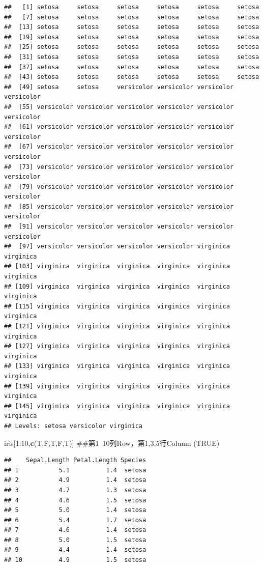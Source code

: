 \documentclass[]{book}
\newenvironment{Shaded}{\begin{snugshade}}{\end{snugshade}}
\newcommand{\KeywordTok}[1]{\textcolor[rgb]{0.13,0.29,0.53}{\textbf{{#1}}}}
\newcommand{\DecValTok}[1]{\textcolor[rgb]{0.00,0.00,0.81}{{#1}}}
\newcommand{\NormalTok}[1]{{#1}}
\theoremstyle{definition}
\theoremstyle{definition}
\theoremstyle{remark}
\begin{document}
\begin{verbatim}
##   [1] setosa     setosa     setosa     setosa     setosa     setosa    
##   [7] setosa     setosa     setosa     setosa     setosa     setosa    
##  [13] setosa     setosa     setosa     setosa     setosa     setosa    
##  [19] setosa     setosa     setosa     setosa     setosa     setosa    
##  [25] setosa     setosa     setosa     setosa     setosa     setosa    
##  [31] setosa     setosa     setosa     setosa     setosa     setosa    
##  [37] setosa     setosa     setosa     setosa     setosa     setosa    
##  [43] setosa     setosa     setosa     setosa     setosa     setosa    
##  [49] setosa     setosa     versicolor versicolor versicolor versicolor
##  [55] versicolor versicolor versicolor versicolor versicolor versicolor
##  [61] versicolor versicolor versicolor versicolor versicolor versicolor
##  [67] versicolor versicolor versicolor versicolor versicolor versicolor
##  [73] versicolor versicolor versicolor versicolor versicolor versicolor
##  [79] versicolor versicolor versicolor versicolor versicolor versicolor
##  [85] versicolor versicolor versicolor versicolor versicolor versicolor
##  [91] versicolor versicolor versicolor versicolor versicolor versicolor
##  [97] versicolor versicolor versicolor versicolor virginica  virginica 
## [103] virginica  virginica  virginica  virginica  virginica  virginica 
## [109] virginica  virginica  virginica  virginica  virginica  virginica 
## [115] virginica  virginica  virginica  virginica  virginica  virginica 
## [121] virginica  virginica  virginica  virginica  virginica  virginica 
## [127] virginica  virginica  virginica  virginica  virginica  virginica 
## [133] virginica  virginica  virginica  virginica  virginica  virginica 
## [139] virginica  virginica  virginica  virginica  virginica  virginica 
## [145] virginica  virginica  virginica  virginica  virginica  virginica 
## Levels: setosa versicolor virginica
\end{verbatim}

\begin{Shaded}
\begin{Highlighting}[]
\NormalTok{iris[}\DecValTok{1}\NormalTok{:}\DecValTok{10}\NormalTok{,}\KeywordTok{c}\NormalTok{(T,F,T,F,T)] ##第1~10列Row，第1,3,5行Column (TRUE)}
\end{Highlighting}
\end{Shaded}

\begin{verbatim}
##    Sepal.Length Petal.Length Species
## 1           5.1          1.4  setosa
## 2           4.9          1.4  setosa
## 3           4.7          1.3  setosa
## 4           4.6          1.5  setosa
## 5           5.0          1.4  setosa
## 6           5.4          1.7  setosa
## 7           4.6          1.4  setosa
## 8           5.0          1.5  setosa
## 9           4.4          1.4  setosa
## 10          4.9          1.5  setosa
\end{verbatim}
\end{document}
